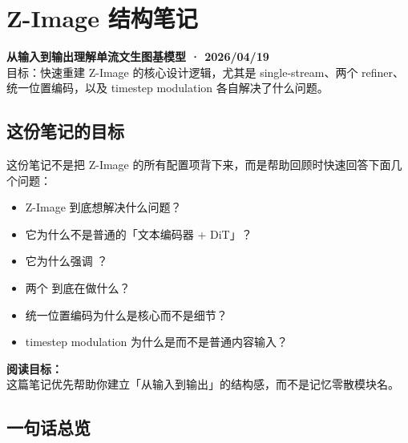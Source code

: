 
\section{Z-Image 结构笔记}

\begin{conceptbox}
\textbf{从输入到输出理解单流文生图基模型 · 2026/04/19}\\
目标：快速重建 Z-Image 的核心设计逻辑，尤其是 single-stream、两个 refiner、统一位置编码，以及 timestep modulation 各自解决了什么问题。
\end{conceptbox}

\subsection{这份笔记的目标}

这份笔记不是把 Z-Image 的所有配置项背下来，而是帮助回顾时快速回答下面几个问题：

\begin{itemize}[leftmargin=1.5em]
  \item Z-Image 到底想解决什么问题？
  \item 它为什么不是普通的「文本编码器 + DiT」？
  \item 它为什么强调 ？
  \item 两个  到底在做什么？
  \item 统一位置编码为什么是核心而不是细节？
  \item timestep modulation 为什么是而不是普通内容输入？
\end{itemize}

\begin{intubox}
\textbf{阅读目标：}\\
这篇笔记优先帮助你建立「从输入到输出」的结构感，而不是记忆零散模块名。
\end{intubox}

\subsection{一句话总览}


